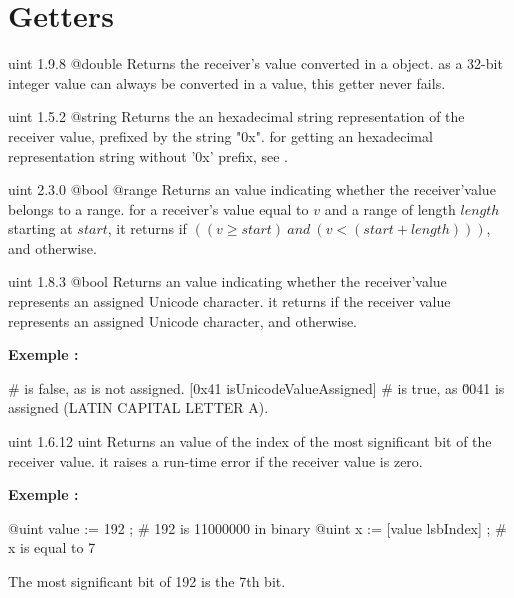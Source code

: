 \section{Getters}

{uint}
{1.9.8}
{@double}
{Returns the receiver's value converted in a  object.}
{as a 32-bit integer value can always be converted in a  value, this getter never fails.}



{uint}
{1.5.2}
{@string}
{Returns the an hexadecimal string representation of the receiver value, prefixed by the string "0x".}
{for getting an hexadecimal representation string without '0x' prefix, see .}



{uint}
{2.3.0}
{@bool}
{@range}
{Returns an  value indicating whether the receiver'value belongs to a range.}
{for a receiver's value equal to $v$ and a range of length $length$ starting at $start$, it returns  if $((v \geqslant start)~and~(v<(start+length)))$, and  otherwise.}



{uint}
{1.8.3}
{@bool}
{Returns an  value indicating whether the receiver'value represents an assigned Unicode character.}
{it returns  if the receiver value represents an assigned Unicode character,  and otherwise.}

\textbf{Exemple :}
\begin{galgascode}
 # is false, as \uFFFF is not assigned.
[0x41 isUnicodeValueAssigned] # is true, as \u0041 is assigned (LATIN CAPITAL LETTER A).
\end{galgascode}



{uint}
{1.6.12}
{uint}
{Returns an  value of the index of the most significant bit of the receiver value.}
{it raises a run-time error if the receiver value is zero.}

\textbf{Exemple :}
\begin{galgascode}
@uint value := 192 ; # 192 is 11000000 in binary
@uint x := [value lsbIndex] ; # x is equal to 7
\end{galgascode}

The most significant bit of 192 is the 7th bit.




